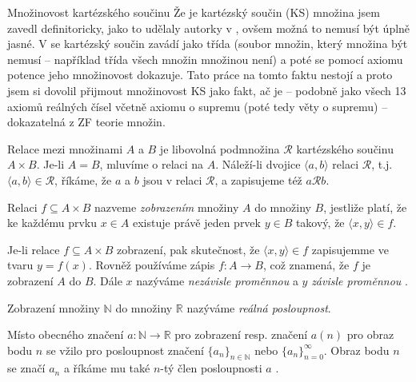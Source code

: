 \begin{myremark}{Množinovost kartézského součinu}\label{rem:mnozinovost_KS}
Že je kartézský součin (KS) množina jsem zavedl definitoricky, jako to udělaly autorky v \cite{EPJVMAI}, ovšem možná to nemusí být úplně jasné. V \cite{TeMno} se kartézský součin zavádí jako třída (soubor množin, který množina být nemusí -- například třída všech množin množinou není) a poté se pomocí axiomu potence jeho množinovost dokazuje. Tato práce na tomto faktu nestojí a proto jsem si dovolil přijmout množinovost KS jako fakt, ač je -- podobně jako všech 13 axiomů reálných čísel včetně axiomu o supremu (poté tedy věty o supremu) \cite{DK:DPFJP} -- dokazatelná z ZF teorie množin.
\end{myremark}

\begin{definition}
Relace mezi množinami $A$ a $B$ je libovolná podmnožina $\mathcal{R}$ kartézského součinu $A\times B$. Je-li $A=B$, mluvíme o relaci na $A$. Náleží-li dvojice $\langle a, b \rangle$ relaci $\mathcal{R}$, t.j. $\langle a,b \rangle \in \mathcal{R}$, říkáme, že $a$ a $b$ jsou v relaci $\mathcal{R}$, a zapisujeme též $a\mathcal{R}b$.
\end{definition}

\begin{definition}
Relaci $f \subseteq A \times B$ nazveme \textit{zobrazením} množiny $A$ do množiny $B$, jestliže platí, že ke každému prvku $x \in A$ existuje právě jeden prvek $y \in B$ takový, že $\langle x, y \rangle \in f$.
\end{definition}

Je-li relace $f \subseteq A \times B$ zobrazení, pak skutečnost, že $\langle x, y \rangle \in f$ zapisujemme ve tvaru $y = f(x)$. Rovněž používáme zápis $f:A\rightarrow B$, což znamená, že $f$ je zobrazení $A$ do $B$. Dále $x$ nazýváme \textit{nezávisle proměnnou} a $y$ \textit{závisle proměnnou} \cite{DK:DPFJP}.

\begin{definition}
Zobrazení množiny $\mathbb{N}$ do množiny $\mathbb{R}$ nazýváme \textit{reálná posloupnost}.
\end{definition}

Místo obecného značení $a:\mathbb{N}\rightarrow\mathbb{R}$ pro zobrazení resp. značení $a(n)$ pro obraz bodu $n$ se vžilo pro posloupnost značení $\{a_n\}_{n\in\mathbb{N}}$ nebo $\{a_n\}_{n=0}^{\infty}$. Obraz bodu $n$ se značí $a_n$ a říkáme mu také $n$-tý člen posloupnosti $a$ \cite{EPJVMAI}. 

